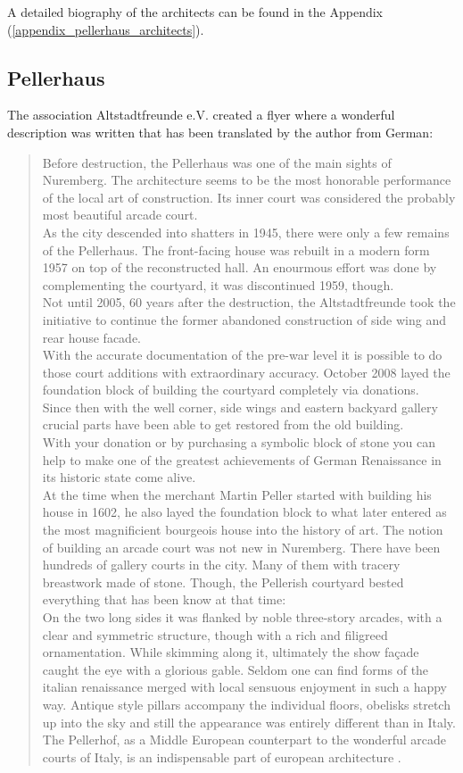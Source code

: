 A detailed biography of the architects can be found in the Appendix (\ref{appendix_pellerhaus_architects}).

\subsection{Pellerhaus}

The association Altstadtfreunde e.V. created a flyer \parencite{afWiederaufbauDesPellerhofes} where a wonderful description was written that has been translated by the author from German:

\blockquote{
	Before destruction, the Pellerhaus was one of the main sights of Nuremberg. The architecture seems to be the most honorable performance of the local art of construction. Its inner court was considered the probably most beautiful arcade court.\\
	As the city descended into shatters in 1945, there were only a few remains of the Pellerhaus. The front-facing house was rebuilt in a modern form 1957 on top of the reconstructed hall. An enourmous effort was done by complementing the courtyard, it was discontinued 1959, though.\\
	Not until 2005, 60 years after the destruction, the Altstadtfreunde took the initiative to continue the former abandoned construction of side wing and rear house facade.\\
	With the accurate documentation of the pre-war level it is possible to do those court additions with extraordinary accuracy. October 2008 layed the foundation block of building the courtyard completely via donations.\\
	Since then with the well corner, side wings and eastern backyard gallery crucial parts have been able to get restored from the old building.\\
	With your donation or by purchasing a symbolic block of stone you can help to make one of the greatest achievements of German Renaissance in its historic state come alive.\\
	At the time when the merchant Martin Peller started with building his house in 1602, he also layed the foundation block to what later entered as the most magnificient bourgeois house into the history of art. The notion of building an arcade court was not new in Nuremberg. There have been hundreds of gallery courts in the city. Many of them with tracery breastwork made of stone. Though, the Pellerish courtyard bested everything that has been know at that time:\\
	On the two long sides it was flanked by noble three-story arcades, with a clear and symmetric structure, though with a rich and filigreed ornamentation. While skimming along it, ultimately the show façade caught the eye with a glorious gable. Seldom one can find forms of the italian renaissance merged with local sensuous enjoyment in such a happy way. Antique style pillars accompany the individual floors, obelisks stretch up into the sky and still the appearance was entirely different than in Italy. The Pellerhof, as a Middle European counterpart to the wonderful arcade courts of Italy, is an indispensable part of european architecture .\\
}




